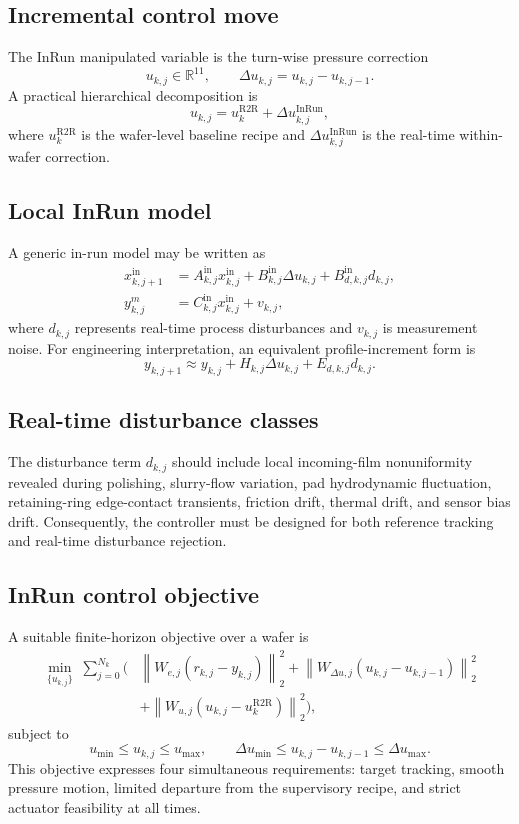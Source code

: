\documentclass[11pt,a4paper]{article}
\newcommand{\R}{\mathbb{R}}
\newcommand{\norm}[1]{\left\lVert #1 \right\rVert}
\begin{document}
\subsection{Incremental control move}
The InRun manipulated variable is the turn-wise pressure correction
\[
u_{k,j}\in\R^{11},\qquad \Delta u_{k,j}=u_{k,j}-u_{k,j-1}.
\]
A practical hierarchical decomposition is
\[
u_{k,j}=u_k^{\mathrm{R2R}}+\Delta u_{k,j}^{\mathrm{InRun}},
\]
where $u_k^{\mathrm{R2R}}$ is the wafer-level baseline recipe and $\Delta u_{k,j}^{\mathrm{InRun}}$ is the real-time within-wafer correction.

\subsection{Local InRun model}
A generic in-run model may be written as
\begin{align*}
x^{\mathrm{in}}_{k,j+1} &= A^{\mathrm{in}}_{k,j}x^{\mathrm{in}}_{k,j}+B^{\mathrm{in}}_{k,j}\Delta u_{k,j}+B^{\mathrm{in}}_{d,k,j}d_{k,j},\\
y^m_{k,j} &= C^{\mathrm{in}}_{k,j}x^{\mathrm{in}}_{k,j}+v_{k,j},
\end{align*}
where $d_{k,j}$ represents real-time process disturbances and $v_{k,j}$ is measurement noise. For engineering interpretation, an equivalent profile-increment form is
\[
y_{k,j+1}\approx y_{k,j}+H_{k,j}\Delta u_{k,j}+E_{d,k,j}d_{k,j}.
\]

\subsection{Real-time disturbance classes}
The disturbance term $d_{k,j}$ should include local incoming-film nonuniformity revealed during polishing, slurry-flow variation, pad hydrodynamic fluctuation, retaining-ring edge-contact transients, friction drift, thermal drift, and sensor bias drift. Consequently, the controller must be designed for both reference tracking and real-time disturbance rejection.

\subsection{InRun control objective}
A suitable finite-horizon objective over a wafer is
\begin{align*}
\min_{\{u_{k,j}\}}\;\sum_{j=0}^{N_k} \Big(&\norm{W_{e,j}(r_{k,j}-y_{k,j})}_2^2+\norm{W_{\Delta u,j}(u_{k,j}-u_{k,j-1})}_2^2\\
&+\norm{W_{u,j}(u_{k,j}-u_k^{\mathrm{R2R}})}_2^2\Big),
\end{align*}
subject to
\[
u_{\min}\le u_{k,j}\le u_{\max},\qquad \Delta u_{\min}\le u_{k,j}-u_{k,j-1}\le \Delta u_{\max}.
\]
This objective expresses four simultaneous requirements: target tracking, smooth pressure motion, limited departure from the supervisory recipe, and strict actuator feasibility at all times.
\end{document}
